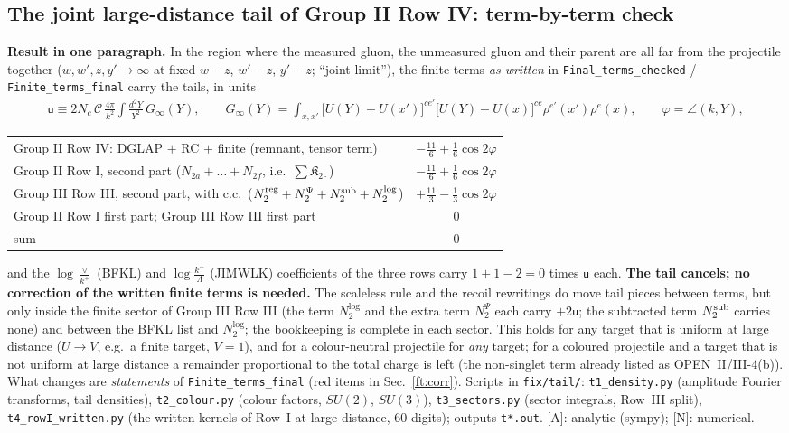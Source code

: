 \documentclass[10pt]{article}
\begin{document}
\subsection{The joint large-distance tail of Group II Row IV: term-by-term check}\label{sec:tailfix}
\noindent\textbf{Result in one paragraph.} In the region where the measured gluon, the unmeasured gluon and their parent are all far from the projectile together ($w,w',z,y'\to\infty$ at fixed $w-z$, $w'-z$, $y'-z$; ``joint limit''), the finite terms \emph{as written} in \texttt{Final\_terms\_checked} / \texttt{Finite\_terms\_final} carry the tails, in units
\begin{align}
\mathsf{u}\equiv2N_{c}\,\mathcal{C}\,\frac{4\pi}{k^{2}}\int\frac{d^{2}Y}{Y^{2}}\,G_{\infty}(Y),\qquad G_{\infty}(Y)=\int_{x,x'}\big[U(Y)-U(x')\big]^{ce'}\big[U(Y)-U(x)\big]^{ce}\rho^{e'}(x')\rho^{e}(x),\qquad\varphi=\angle(k,Y),
\label{ft:unit}
\end{align}
\begin{center}
\renewcommand{\arraystretch}{1.3}
\begin{tabular}{|l|c|}\hline
Group II Row IV: DGLAP $+$ RC $+$ finite (remnant, tensor term) & $-\frac{11}{6}+\frac16\cos2\varphi$\\
Group II Row I, second part ($N_{2a}+\dots+N_{2f}$, i.e.\ $\sum\mathfrak{K}_{2\cdot}$) & $-\frac{11}{6}+\frac16\cos2\varphi$\\
Group III Row III, second part, with c.c.\ ($N_{2}^{\rm reg}+N_{2}^{\Psi}+N_{2}^{\rm sub}+N_{2}^{\log}$) & $+\frac{11}{3}-\frac13\cos2\varphi$\\
Group II Row I first part; Group III Row III first part & $0$\\\hline
sum & $0$\\\hline
\end{tabular}
\end{center}
and the $\log\frac{\vee}{k^{+}}$ (BFKL) and $\log\frac{k^{+}}{\Lambda}$ (JIMWLK) coefficients of the three rows carry $1+1-2=0$ times $\mathsf{u}$ each. \textbf{The tail cancels; no correction of the written finite terms is needed.} The scaleless rule and the recoil rewritings do move tail pieces between terms, but only inside the finite sector of Group III Row III (the term $N_{2}^{\log}$ and the extra term $N_{2}^{\Psi}$ each carry $+2\mathsf{u}$; the subtracted term $N_{2}^{\rm sub}$ carries none) and between the BFKL list and $N_{2}^{\log}$; the bookkeeping is complete in each sector. This holds for any target that is uniform at large distance ($U\to V$, e.g.\ a finite target, $V=1$), and for a colour-neutral projectile for \emph{any} target; for a coloured projectile and a target that is not uniform at large distance a remainder proportional to the total charge is left (the non-singlet term already listed as OPEN~II/III-4(b)). What changes are \emph{statements} of \texttt{Finite\_terms\_final} (red items in Sec.~\ref{ft:corr}). Scripts in \texttt{fix/tail/}: \texttt{t1\_density.py} (amplitude Fourier transforms, tail densities), \texttt{t2\_colour.py} (colour factors, $SU(2)$, $SU(3)$), \texttt{t3\_sectors.py} (sector integrals, Row~III split), \texttt{t4\_rowI\_written.py} (the written kernels of Row~I at large distance, 60 digits); outputs \texttt{t*.out}. [A]: analytic (sympy); [N]: numerical.
\end{document}

